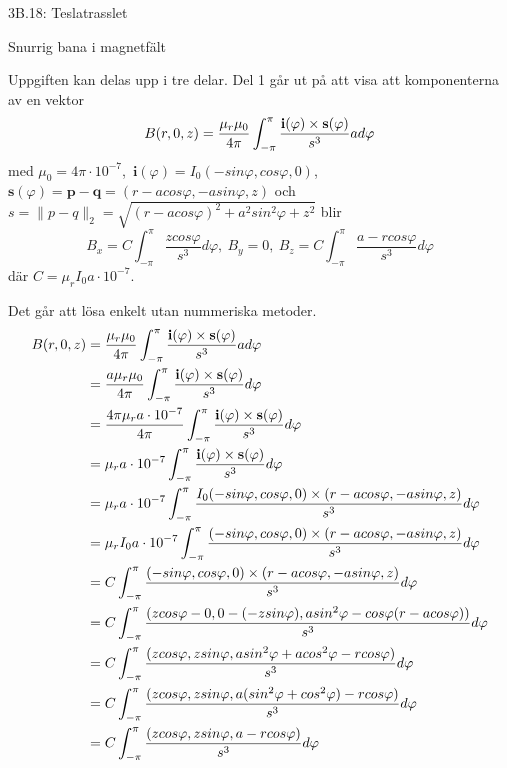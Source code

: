 \documentclass[a4paper]{article}
\begin{document}
\centerline{\sc \large 3B.18: Teslatrasslet}
\vspace{.5pc}
\centerline{\sc Snurrig bana i magnetfält}
\vspace{2pc}

Uppgiften kan delas upp i tre delar. Del 1 går ut på att visa att
komponenterna av en vektor 
$$
B(r, 0, z) = \frac{\mu_r\mu_0}{4\pi} \int_{-\pi}^\pi
\frac{\bf{i}(\varphi)\times\bf{s}(\varphi)}{s^3}ad\varphi
$$
med $\mu_0 = 4\pi \cdot 10^{-7}$,\ $\mathbf{i}(\varphi) = I_0(-sin\varphi,
cos\varphi, 0)$,\ $\mathbf{s}(\varphi) = \mathbf{p} - \mathbf{q} = (r -
acos\varphi, -asin\varphi, z)$ och $s = \|p - q\|_2 = \sqrt{(r - acos\varphi)^2
+ a^2sin^2\varphi + z^2}$ blir
$$
B_x = C\int_{-\pi}^\pi \frac{zcos\varphi}{s^3}d\varphi, \
B_y = 0,\
B_z = C\int_{-\pi}^\pi \frac{a - rcos\varphi}{s^3}d\varphi 
$$
där $C = \mu_rI_0a \cdot 10^{-7}$.

\vspace{1pc}
Det går att lösa enkelt utan nummeriska metoder. 
\begin{eqnarray*}
  B(r, 0, z) & = \frac{\mu_r\mu_0}{4\pi} \int_{-\pi}^\pi
  \frac{\bf{i}(\varphi)\times\bf{s}(\varphi)}{s^3}ad\varphi \\
  & = \frac{a\mu_r\mu_0}{4\pi} \int_{-\pi}^\pi
  \frac{\bf{i}(\varphi)\times\bf{s}(\varphi)}{s^3}d\varphi \\
  & = \frac{4\pi\mu_ra \cdot 10^{-7}}{4\pi} \int_{-\pi}^\pi 
  \frac{\bf{i}(\varphi)\times\bf{s}(\varphi)}{s^3}d\varphi \\
  & = \mu_ra \cdot 10^{-7} \int_{-\pi}^\pi
  \frac{\bf{i}(\varphi)\times\bf{s}(\varphi)}{s^3}d\varphi \\
  & = \mu_ra \cdot 10^{-7} \int_{-\pi}^\pi
  \frac{I_0(-sin\varphi, cos\varphi, 0)\times(r - acos\varphi, -asin\varphi,
  z)}{s^3}d\varphi \\
  & = \mu_rI_0a \cdot 10^{-7} \int_{-\pi}^\pi
  \frac{(-sin\varphi, cos\varphi, 0)\times(r - acos\varphi, -asin\varphi,
  z)}{s^3}d\varphi \\
  & = C \int_{-\pi}^\pi
  \frac{(-sin\varphi, cos\varphi, 0)\times(r - acos\varphi, -asin\varphi,
  z)}{s^3}d\varphi \\
  & = C \int_{-\pi}^\pi
  \frac{(zcos\varphi - 0, 0 - (-zsin\varphi), asin^2\varphi - cos\varphi(r -
  acos\varphi))}{s^3}d\varphi \\
  & = C \int_{-\pi}^\pi
  \frac{(zcos\varphi, zsin\varphi, asin^2\varphi + acos^2\varphi - rcos\varphi)}{s^3}d\varphi \\
  & = C \int_{-\pi}^\pi
  \frac{(zcos\varphi, zsin\varphi, a(sin^2\varphi + cos^2\varphi) - rcos\varphi)}{s^3}d\varphi \\
  & = C \int_{-\pi}^\pi
  \frac{(zcos\varphi, zsin\varphi, a - rcos\varphi)}{s^3}d\varphi \\
\end{eqnarray*}
\end{document}

